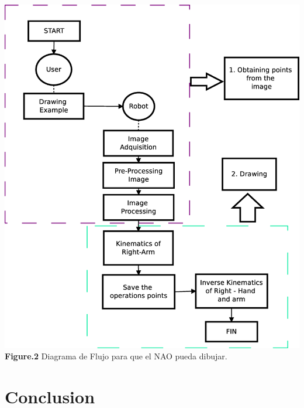 \documentclass[conference]{IEEEtran}
\begin{document}
\begin{strip}
\begin{center}
\includegraphics[scale=0.3]{flowchart.eps}\\
\textbf{Figure.2} Diagrama de Flujo para que el NAO pueda dibujar.
\end{center}
\end{strip}





\section{Conclusion}
\label{sec:conclusion}



\end{document}
